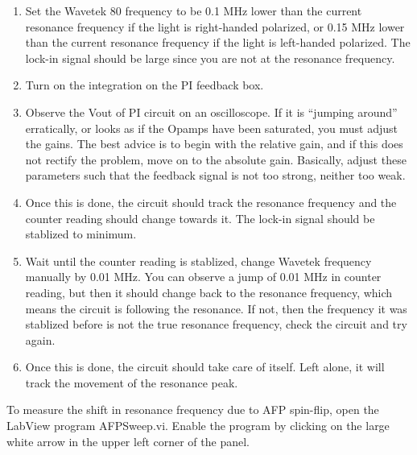 {\begin{enumerate}
\begin{itemize}
\item Reconnect the Vin input, and
set the 100:1 attenuator switch from ``FMS (short)'' back to ``AFP (100:1)''.   
\end{itemize}

\item Set the Wavetek 80 frequency
to be 0.1 MHz lower than the current resonance frequency if the light is
right-handed polarized, or 0.15 MHz lower than the current resonance frequency 
if the light is left-handed polarized.
The lock-in signal should be large since you are not at the resonance frequency.

\item Turn on the integration on the PI feedback box.

\item Observe the Vout of PI circuit on an oscilloscope.  If it is ``jumping
around'' erratically, or looks as if the  Opamps have been saturated, you
must adjust the gains.  The best advice
is to begin with the relative gain, and if this does not rectify the
problem, move on to the absolute gain. 
Basically, adjust these parameters such that the feedback signal is not too strong,
neither too weak. \\

\item Once this is done, the circuit should track
the resonance frequency and the counter reading should change towards it.  The lock-in
signal should be stablized to minimum.   

\item Wait until the counter reading is stablized, change Wavetek frequency manually
by 0.01 MHz.  You can observe a jump of 0.01 MHz in counter reading, but then
it should change back to the resonance frequency, which means the circuit is following
the resonance.  If not, then the frequency
it was stablized before is not the true resonance frequency, check the circuit and
try again.

\item Once this is done, the circuit
should take care of itself.  Left alone, it will track the movement of
the resonance peak.
\end{enumerate}        

To measure the shift in resonance frequency due to AFP spin-flip, 
open the LabView program AFPSweep.vi.  Enable the program by clicking
on the large white arrow in the upper left corner of the panel.

}
